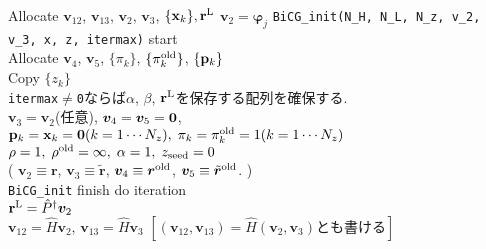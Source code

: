 \documentclass[12pt,titlepage]{jarticle}
\renewenvironment{leftbar}{%
  \def\FrameCommand{\vrule width 1pt \hspace{0pt}}%
  \MakeFramed {\advance\hsize-\width \FrameRestore}}%
 {\endMakeFramed}
\begin{document}
\noindent
Allocate ${\boldsymbol v}_{1 2}$, ${\boldsymbol v}_{1 3}$, 
${\boldsymbol v}_2$, ${\boldsymbol v}_3$, $\{{\bf x}_k\}, {\bf r}^{\rm L}$
${\boldsymbol v}_2 = {\boldsymbol \varphi_j}$
\vspace{-1em}
\begin{leftbar}
  \noindent
  \verb|BiCG_init(N_H, N_L, N_z, v_2, v_3, x, z, itermax)| start
  \\ \hspace{0.5cm}
  Allocate ${\boldsymbol v}_4$, ${\boldsymbol v}_5$, $\{\pi_k\}$, $\{\pi_k^{\rm old}\}$, $\{{\bf p}_k\}$
  \\ \hspace{0.5cm}
  Copy $\{z_k\}$
  \\ \hspace{0.5cm}
  \verb|itermax|$\neq$\verb|0|ならば$\alpha$, $\beta$, ${\bf r}^{\rm L}$を保存する配列を確保する.
  \\ \hspace{0.5cm}
  ${\boldsymbol v}_3 = {\boldsymbol v}_2$(任意),
  ${\boldsymbol v}_4 = {\boldsymbol v}_5 = {\bf 0}$,
  \\ \hspace{0.5cm}
  ${\bf p}_{k} = {\bf x}_k = {\bf 0}(k=1 \cdots N_z),\; \pi_k=\pi_k^{\rm old} = 1(k=1 \cdots N_z)$ 
  \\ \hspace{0.5cm}
  $\rho = 1,\; \rho^{\rm old} = \infty,\; \alpha = 1,\; z_{\rm seed}=0$ 
  \\ \hspace{0.5cm}
  (
  ${\boldsymbol v}_2 \equiv {\boldsymbol r}$, 
  ${\boldsymbol v}_3 \equiv {\tilde {\boldsymbol r}}$, 
  ${\boldsymbol v}_4 \equiv {\boldsymbol r}^{\rm old}$,
  ${\boldsymbol v}_5 \equiv {\tilde {\boldsymbol r}}^{\rm old}$. )
  \\
  \verb|BiCG_init| finish
\end{leftbar}
\vspace{-1em}
\noindent
do iteration
\\\hspace{0.5cm}
${\bf r}^{\rm L} = {\hat P}^\dagger {\boldsymbol v}_2$
\\\hspace{0.5cm}
${\boldsymbol v}_{1 2} = {\hat H} {\boldsymbol v}_2$, 
  ${\boldsymbol v}_{1 3} = {\hat H} {\boldsymbol v}_3$  
$[ ({\boldsymbol v}_{1 2}, {\boldsymbol v}_{1 3}) = {\hat H}
  ({\boldsymbol v}_2, {\boldsymbol v}_3)とも書ける]$
\vspace{-1em}
\end{document}
